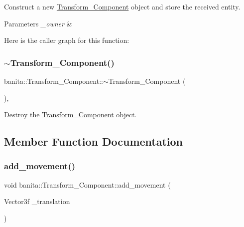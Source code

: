 Construct a new \mbox{\hyperlink{classbanita_1_1_transform___component}{Transform\+\_\+\+Component}} object and store the received entity. 


\begin{DoxyParams}{Parameters}
{\em \+\_\+owner} & \\
\hline
\end{DoxyParams}
Here is the caller graph for this function\+:
\mbox{\label{classbanita_1_1_transform___component_a87e6794c494fefc601ed15c84eaff97c}} 
\subsubsection{\texorpdfstring{$\sim$Transform\_Component()}{~Transform\_Component()}}
{\footnotesize\ttfamily banita\+::\+Transform\+\_\+\+Component\+::$\sim$\+Transform\+\_\+\+Component (\begin{DoxyParamCaption}{ }\end{DoxyParamCaption})\hspace{0.3cm}{\ttfamily [inline]}, {\ttfamily [override]}}



Destroy the \mbox{\hyperlink{classbanita_1_1_transform___component}{Transform\+\_\+\+Component}} object. 



\subsection{Member Function Documentation}
\mbox{\label{classbanita_1_1_transform___component_a71e4e16cdbd98c641389455b455ceb01}} 
\subsubsection{\texorpdfstring{add\_movement()}{add\_movement()}}
{\footnotesize\ttfamily void banita\+::\+Transform\+\_\+\+Component\+::add\+\_\+movement (\begin{DoxyParamCaption}\item[{Vector3f}]{\+\_\+translation }\end{DoxyParamCaption})\hspace{0.3cm}{\ttfamily [inline]}}



